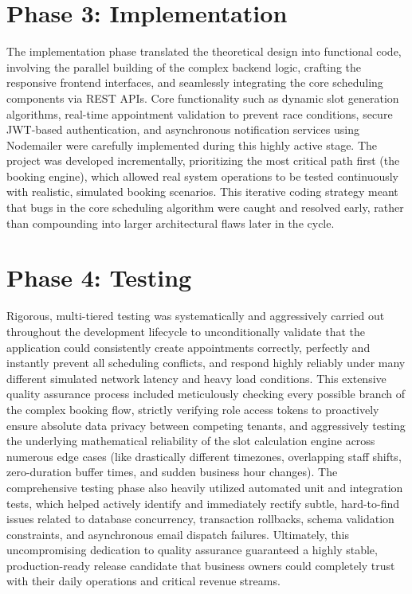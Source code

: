 \section{Phase 3: Implementation}
The implementation phase translated the theoretical design into functional code, involving the parallel building of the complex backend logic, crafting the responsive frontend interfaces, and seamlessly integrating the core scheduling components via REST APIs. Core functionality such as dynamic slot generation algorithms, real-time appointment validation to prevent race conditions, secure JWT-based authentication, and asynchronous notification services using Nodemailer were carefully implemented during this highly active stage. The project was developed incrementally, prioritizing the most critical path first (the booking engine), which allowed real system operations to be tested continuously with realistic, simulated booking scenarios. This iterative coding strategy meant that bugs in the core scheduling algorithm were caught and resolved early, rather than compounding into larger architectural flaws later in the cycle.

\section{Phase 4: Testing}
Rigorous, multi-tiered testing was systematically and aggressively carried out throughout the development lifecycle to unconditionally validate that the application could consistently create appointments correctly, perfectly and instantly prevent all scheduling conflicts, and respond highly reliably under many different simulated network latency and heavy load conditions. This extensive quality assurance process included meticulously checking every possible branch of the complex booking flow, strictly verifying role access tokens to proactively ensure absolute data privacy between competing tenants, and aggressively testing the underlying mathematical reliability of the slot calculation engine across numerous edge cases (like drastically different timezones, overlapping staff shifts, zero-duration buffer times, and sudden business hour changes). The comprehensive testing phase also heavily utilized automated unit and integration tests, which helped actively identify and immediately rectify subtle, hard-to-find issues related to database concurrency, transaction rollbacks, schema validation constraints, and asynchronous email dispatch failures. Ultimately, this uncompromising dedication to quality assurance guaranteed a highly stable, production-ready release candidate that business owners could completely trust with their daily operations and critical revenue streams.

